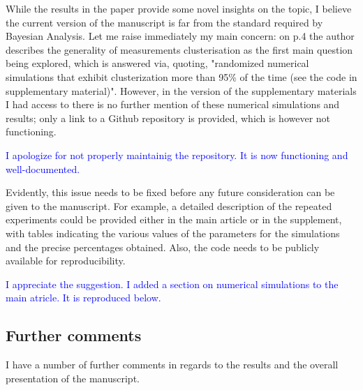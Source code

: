 \documentclass{amsart}
\newcommand{\answer}[1]{\vskip 0.05in \textcolor{blue}{#1} \vskip 0.05in}
\begin{document}
While the results in the paper provide some novel insights on the
topic, I believe the current version of the manuscript is far from the
standard required by Bayesian Analysis. Let me raise immediately my
main concern: on p.4 the author describes the generality of
measurements clusterisation as the first main question being explored,
which is answered via, quoting, "randomized numerical simulations that
exhibit clusterization more than 95\% of the time (see the code in
supplementary material)". However, in the version of the supplementary
materials I had access to there is no further mention of these
numerical simulations and results; only a link to a Github repository
is provided, which is however not functioning.

\answer{I apologize for not properly maintainig the repository. It is
  now functioning and well-documented.}

Evidently, this issue needs to be fixed before any future
consideration can be given to the manuscript. For example, a detailed
description of the repeated experiments could be provided either in
the main article or in the supplement, with tables indicating the
various values of the parameters for the simulations and the precise
percentages obtained. Also, the code needs to be publicly available
for reproducibility.

\answer{I appreciate the suggestion. I added a section on numerical
simulations to the main atricle. It is reproduced below.}



\subsection{Further comments}
I have a number of further comments in regards to the results and the
overall presentation of the manuscript.
\end{document}
